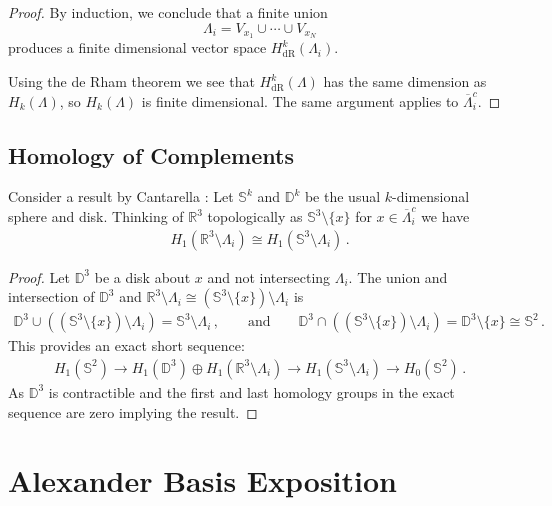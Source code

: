 \documentclass[11pt]{article}
\theoremstyle{plain}
\theoremstyle{definition}
\theoremstyle{remark}
\newcommand{\R}{\mathbb{R}}
\newcommand{\ST}{\Lambda}
\begin{document}
\begin{proof}
By induction, we conclude that a finite union
\[
\ST_i = V_{x_1}\cup\cdots\cup V_{x_N}
\]
produces a finite dimensional vector space \(H^k_{\mathrm{dR}}(\ST_i)\).

Using the de Rham theorem we see that \(H^k_{\mathrm{dR}} (\ST)\) has the same dimension as \( H_{k} (\ST) \), so \(H_{k} (\ST)\) is finite dimensional. The same argument applies to \(\overline{\ST}_i^c\).
\end{proof}




\subsection{Homology of Complements}\label{sub:complement}



Consider a result by Cantarella \cite{CANTARELLA20101127}: Let \(\mathbb{S}^k\) and \(\mathbb{D}^k\) be the usual \(k\)-dimensional sphere and disk. Thinking of \(\R^3\) topologically as \(\mathbb{S}^3 \setminus \{x\}\) for \(x \in \overline{\ST}_i^c\) we have
\begin{align*}
    H_1( \R^3 \setminus \ST_i ) \cong H_1( \mathbb{S}^3 \setminus \ST_i ) \, . 
\end{align*}
\begin{proof}
    Let \(\mathbb{D}^3\) be a disk about \(x\) and not intersecting \(\ST_i\). The union and intersection of \(\mathbb{D}^3\) and \(\R^3 \setminus \ST_i \cong (\mathbb{S}^3 \setminus\{x\}) \setminus \ST_i\) is
    \begin{align*}
        \mathbb{D}^3 \cup ( (\mathbb{S}^3 \setminus \{x\}) \setminus \ST_i ) = \mathbb{S}^3 \setminus \ST_i \, ,
        \qquad 
        \text{and}
        \qquad 
        \mathbb{D}^3 \cap ( (\mathbb{S}^3 \setminus \{x\}) \setminus \ST_i ) = \mathbb{D}^3  \setminus \{x\}  \cong \mathbb{S}^2 \, .
    \end{align*}
    This provides an exact short sequence:
    \begin{align*}
        H_1(\mathbb{S}^2) \to H_1(\mathbb{D}^3) \oplus H_1( \R^3 \setminus \ST_i )  \to H_1( \mathbb{S}^3 \setminus \ST_i ) \to H_0(\mathbb{S}^2) \, .
    \end{align*}
    As \(\mathbb{D}^3\) is contractible and the first and last homology groups in the exact sequence are zero implying the result. 
\end{proof}



\section{Alexander Basis Exposition}\label{section:Alexander Basis}
\end{document}
